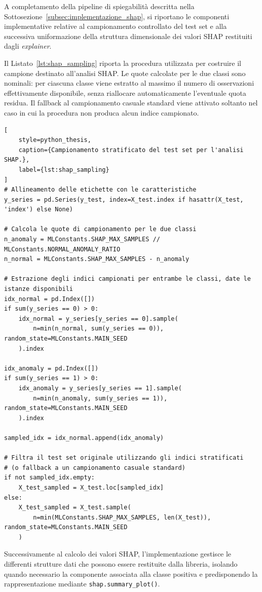 A completamento della pipeline di spiegabilità descritta nella Sottosezione~\ref{subsec:implementazione_shap}, si riportano le componenti implementative relative al campionamento controllato del test set e alla successiva uniformazione della struttura dimensionale dei valori SHAP restituiti dagli \textit{explainer}.

Il Listato~\ref{lst:shap_sampling} riporta la procedura utilizzata per costruire il campione destinato all'analisi SHAP. Le quote calcolate per le due classi sono nominali: per ciascuna classe viene estratto al massimo il numero di osservazioni effettivamente disponibile, senza riallocare automaticamente l'eventuale quota residua. Il fallback al campionamento casuale standard viene attivato soltanto nel caso in cui la procedura non produca alcun indice campionato.

\begin{lstlisting}[
    style=python_thesis,
    caption={Campionamento stratificato del test set per l'analisi SHAP.},
    label={lst:shap_sampling}
]
# Allineamento delle etichette con le caratteristiche
y_series = pd.Series(y_test, index=X_test.index if hasattr(X_test, 'index') else None)

# Calcola le quote di campionamento per le due classi
n_anomaly = MLConstants.SHAP_MAX_SAMPLES // MLConstants.NORMAL_ANOMALY_RATIO
n_normal = MLConstants.SHAP_MAX_SAMPLES - n_anomaly

# Estrazione degli indici campionati per entrambe le classi, date le istanze disponibili
idx_normal = pd.Index([])
if sum(y_series == 0) > 0:
    idx_normal = y_series[y_series == 0].sample(
        n=min(n_normal, sum(y_series == 0)), random_state=MLConstants.MAIN_SEED
    ).index

idx_anomaly = pd.Index([])
if sum(y_series == 1) > 0:
    idx_anomaly = y_series[y_series == 1].sample(
        n=min(n_anomaly, sum(y_series == 1)), random_state=MLConstants.MAIN_SEED
    ).index

sampled_idx = idx_normal.append(idx_anomaly)

# Filtra il test set originale utilizzando gli indici stratificati
# (o fallback a un campionamento casuale standard)
if not sampled_idx.empty:
    X_test_sampled = X_test.loc[sampled_idx]
else:
    X_test_sampled = X_test.sample(
        n=min(MLConstants.SHAP_MAX_SAMPLES, len(X_test)), random_state=MLConstants.MAIN_SEED
    )
\end{lstlisting}

Successivamente al calcolo dei valori SHAP, l'implementazione gestisce le differenti strutture dati che possono essere restituite dalla libreria, isolando quando necessario la componente associata alla classe positiva e predisponendo la rappresentazione mediante \texttt{shap.summary\_plot()}.

